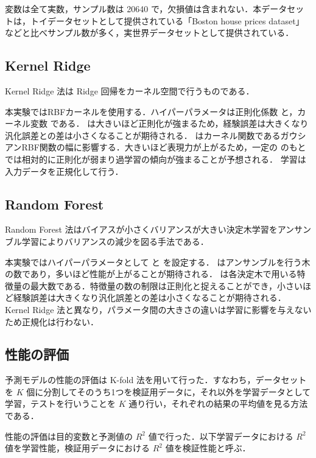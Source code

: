 \documentclass[10pt,a4paper,dvipdfmx]{jsarticle}
\begin{document}
変数は全て実数，サンプル数は 20640 で，欠損値は含まれない．本データセットは，トイデータセットとして提供されている「Boston house prices dataset」などと比べサンプル数が多く，実世界データセットとして提供されている．

\subsection{Kernel Ridge}

Kernel Ridge 法は Ridge 回帰をカーネル空間で行うものである．

本実験ではRBFカーネルを使用する．ハイパーパラメータは正則化係数  と，カーネル変数  である． は大きいほど正則化が強まるため，経験誤差は大きくなり汎化誤差との差は小さくなることが期待される．  はカーネル関数であるガウシアンRBF関数の幅に影響する．大きいほど表現力が上がるため，一定の のもとでは相対的に正則化が弱まり過学習の傾向が強まることが予想される．
学習は入力データを正規化して行う．

\subsection{Random Forest}

Random Forest 法はバイアスが小さくバリアンスが大きい決定木学習をアンサンブル学習によりバリアンスの減少を図る手法である．

本実験ではハイパーパラメータとして  と  を設定する． はアンサンブルを行う木の数であり，多いほど性能が上がることが期待される． は各決定木で用いる特徴量の最大数である．特徴量の数の制限は正則化と捉えることができ，小さいほど経験誤差は大きくなり汎化誤差との差は小さくなることが期待される．
Kernel Ridge 法と異なり，パラメータ間の大きさの違いは学習に影響を与えないため正規化は行わない．

\subsection{性能の評価}

予測モデルの性能の評価は K-fold 法を用いて行った．すなわち，データセットを $K$ 個に分割してそのうち1つを検証用データに，それ以外を学習データとして学習，テストを行いうことを $K$ 通り行い，それぞれの結果の平均値を見る方法である．

性能の評価は目的変数と予測値の $R^2$ 値で行った．以下学習データにおける $R^2$ 値を学習性能，検証用データにおける $R^2$ 値を検証性能と呼ぶ．
\end{document}
